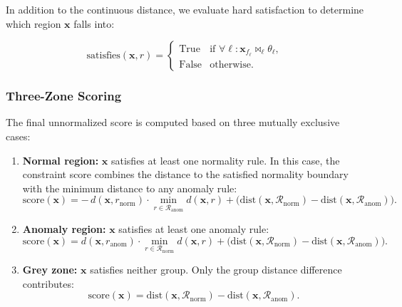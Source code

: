 In addition to the continuous distance, we evaluate hard satisfaction to determine which region $\mathbf{x}$ falls into:

\begin{equation}
\text{satisfies}(\mathbf{x}, r) = \begin{cases}
\text{True} & \text{if } \forall \ell: \mathbf{x}_{f_\ell} \bowtie_\ell \theta_\ell, \\
\text{False} & \text{otherwise}.
\end{cases}
\label{eq:hard_satisfaction}
\end{equation}

\subsubsection{Three-Zone Scoring}

The final unnormalized score is computed based on three mutually exclusive cases:

\begin{enumerate}
  \item \textbf{Normal region:} $\mathbf{x}$ satisfies at least one normality rule. In this case, the constraint score combines the distance to the satisfied normality boundary with the minimum distance to any anomaly rule:
  \begin{equation}
  \text{score}(\mathbf{x}) = -\, d(\mathbf{x}, r_{\text{norm}}) \cdot \min_{r \in \mathcal{R}_{\text{anom}}} d(\mathbf{x}, r) + \bigl( \text{dist}(\mathbf{x}, \mathcal{R}_{\text{norm}}) - \text{dist}(\mathbf{x}, \mathcal{R}_{\text{anom}}) \bigr).
  \label{eq:normal_region}
  \end{equation}
  
  \item \textbf{Anomaly region:} $\mathbf{x}$ satisfies at least one anomaly rule:
  \begin{equation}
  \text{score}(\mathbf{x}) = d(\mathbf{x}, r_{\text{anom}}) \cdot \min_{r \in \mathcal{R}_{\text{norm}}} d(\mathbf{x}, r) + \bigl( \text{dist}(\mathbf{x}, \mathcal{R}_{\text{norm}}) - \text{dist}(\mathbf{x}, \mathcal{R}_{\text{anom}}) \bigr).
  \label{eq:anomaly_region}
  \end{equation}
  
  \item \textbf{Grey zone:} $\mathbf{x}$ satisfies neither group. Only the group distance difference contributes:
  \begin{equation}
  \text{score}(\mathbf{x}) = \text{dist}(\mathbf{x}, \mathcal{R}_{\text{norm}}) - \text{dist}(\mathbf{x}, \mathcal{R}_{\text{anom}}).
  \label{eq:grey_zone}
  \end{equation}
\end{enumerate}

